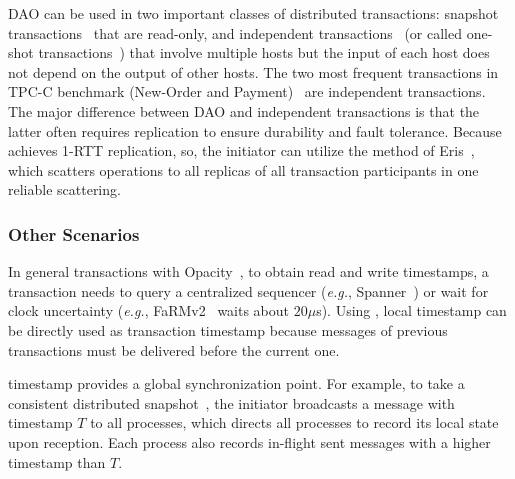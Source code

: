 DAO can be used in two important classes of distributed transactions: snapshot transactions~\cite{corbett2013spanner} that are read-only, and independent transactions~\cite{eris} (or called one-shot transactions~\cite{kallman2008h}) that involve multiple hosts but the input of each host does not depend on the output of other hosts.
The two most frequent transactions in TPC-C benchmark (New-Order and Payment)~\cite{tpcc} are independent transactions.
The major difference between DAO and independent transactions is that the latter often requires replication to ensure durability and fault tolerance.
Because \sys{} achieves 1-RTT replication, so, the initiator can utilize the method of Eris~\cite{eris}, which scatters operations to all replicas of all transaction participants in one reliable scattering.


\subsubsection{Other Scenarios}

In general transactions with Opacity~\cite{shamis2019fast}, to obtain read and write timestamps, a transaction needs to query a centralized sequencer (\textit{e.g.}, Spanner~\cite{corbett2013spanner}) or wait for clock uncertainty (\textit{e.g.}, FaRMv2~\cite{shamis2019fast} waits about $20 \mu$s). Using \sys{}, local timestamp can be directly used as transaction timestamp because messages of previous transactions must be delivered before the current one.

\sys{} timestamp provides a global synchronization point.
For example, to take a consistent distributed snapshot~\cite{chandy1985distributed}, the initiator broadcasts a message with timestamp $T$ to all processes, which directs all processes to record its local state upon reception. Each process also records in-flight sent messages with a higher timestamp than $T$.

